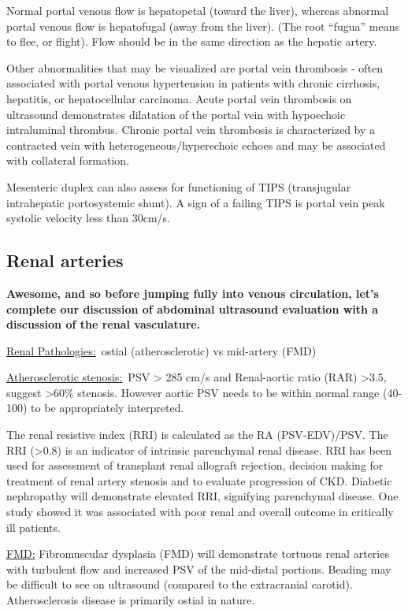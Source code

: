 \documentclass[
]{book}
\begin{document}
Normal portal venous flow is hepatopetal (toward the liver), whereas
abnormal portal venous flow is hepatofugal (away from the liver). (The
root ``fugua'' means to flee, or flight). Flow should be in the same
direction as the hepatic artery.

Other abnormalities that may be visualized are portal vein thrombosis -
often associated with portal venous hypertension in patients with
chronic cirrhosis, hepatitis, or hepatocellular carcinoma. Acute portal
vein thrombosis on ultrasound demonstrates dilatation of the portal vein
with hypoechoic intraluminal thrombus. Chronic portal vein thrombosis is
characterized by a contracted vein with heterogeneous/hyperechoic echoes
and may be associated with collateral formation.\citep{chawla2015, nouvini2013}

Mesenteric duplex can also assess for functioning of TIPS (transjugular
intrahepatic portosystemic shunt). A sign of a failing TIPS is portal
vein peak systolic velocity less than 30cm/s.

\hypertarget{renal-arteries}{%
\subsection{Renal arteries}\label{renal-arteries}}

\textbf{Awesome, and so before jumping fully into venous circulation, let's
complete our discussion of abdominal ultrasound evaluation with a
discussion of the renal vasculature.}

\uline{Renal Pathologies:}~ostial (atherosclerotic) vs mid-artery
(FMD)

\uline{Atherosclerotic stenosis:}~PSV \textgreater{} 285 cm/s and Renal-aortic
ratio (RAR) \textgreater3.5, suggest \textgreater60\% stenosis.\citep{schäberle2016} However
aortic PSV needs to be within normal range (40-100) to be appropriately
interpreted.

The renal resistive index (RRI) is calculated as the RA (PSV-EDV)/PSV.
The RRI (\textgreater0.8) is an indicator of intrinsic parenchymal renal disease.
RRI has been used for assessment of transplant renal allograft
rejection, decision making for treatment of renal artery stenosis and to
evaluate progression of CKD. Diabetic nephropathy will demonstrate
elevated RRI, signifying parenchymal disease.\citep{viazzi2014} One study
showed it was associated with poor renal and overall outcome in
critically ill patients.\citep{ledorze2012}

\uline{FMD:} Fibromuscular dysplasia (FMD) will demonstrate
tortuous renal arteries with turbulent flow and increased PSV of the
mid-distal portions. Beading may be difficult to see on ultrasound
(compared to the extracranial carotid). Atherosclerosis disease is
primarily ostial in nature.
\end{document}

